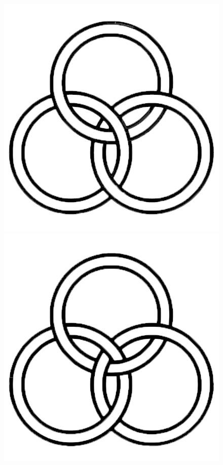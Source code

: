 \documentclass[12pt]{article}
\begin{document}
  \begin{figure}[H]
\centering
\begin{minipage}{0.25\textwidth}
    \centering
             \includegraphics[width=\textwidth]{images/aborromean}
\end{minipage}
\hspace{1em}
\begin{minipage}{0.25\textwidth}
    \centering
            \includegraphics[width=\textwidth]{images/borromean}

\end{minipage}
\end{figure}
\end{document}
